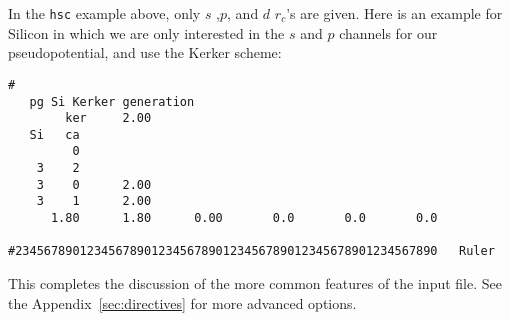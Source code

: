 \documentclass[11pt]{article}
\begin{document}
In the {\tt hsc} example above, only $s$ ,$p$, and $d$ $r_c$'s are
given. Here is an example for Silicon in which we are only interested
in the $s$ and $p$ channels for our pseudopotential, and use the Kerker
scheme:

\begin{verbatim}
# 
   pg Si Kerker generation
        ker     2.00
   Si   ca
         0
    3    2
    3    0      2.00
    3    1      2.00
      1.80      1.80      0.00       0.0       0.0       0.0

#23456789012345678901234567890123456789012345678901234567890   Ruler
\end{verbatim}


This completes the discussion of the more common features of the input
file. See the Appendix~\ref{sec:directives} for more advanced options.

\end{document}
